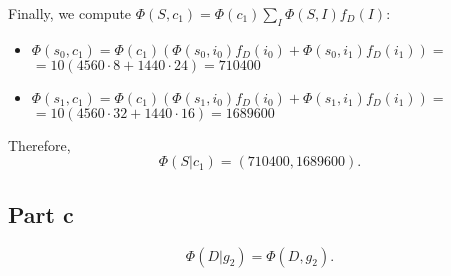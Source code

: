 \documentclass[11pt,a4paper]{article}
\begin{document}
	 Finally, we compute $\Phi(S, c_1) = \Phi(c_1)  \sum_I \Phi(S, I) f_D(I): $
	 \begin{itemize}
	 	\item $ \Phi(s_0, c_1) = \Phi(c_1) ( \Phi(s_0, i_0) f_D(i_0) + \Phi(s_0, i_1) f_D(i_1))  = $ \\
	 	$= 10 (4560 \cdot 8 + 1440 \cdot 24) = 710400$
 		\item $ \Phi(s_1, c_1) = \Phi(c_1) ( \Phi(s_1, i_0) f_D(i_0) + \Phi(s_1, i_1) f_D(i_1))  = $ \\
 		$= 10 (4560 \cdot 32 + 1440 \cdot 16) = 1689600$
	 \end{itemize}
	 
	 Therefore, $$ \Phi(S | c_1) = (710400, 1689600). $$
	
\subsection*{Part c}
	 $$ \Phi(D | g_2) = \Phi(D, g_2).$$
	 
	 
	
\end{document}
